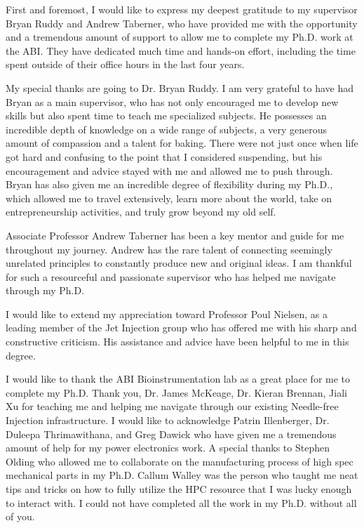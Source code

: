 \begin{acknowledgements}


    First and foremost, I would like to express my deepest gratitude to my supervisor Bryan Ruddy and Andrew Taberner, who have provided me with the opportunity and a tremendous amount of support to allow me to complete my Ph.D. work at the ABI. They have dedicated much time and hands-on effort, including the time spent outside of their office hours in the last four years.
    
    
    My special thanks are going to Dr. Bryan Ruddy. I am very
    grateful to have had Bryan as a main supervisor, who has not only encouraged me to develop new skills but also spent time to teach me specialized subjects. He possesses an incredible depth of knowledge on a wide range of subjects, a very generous amount of compassion and a talent for baking. There were not just once when life got hard and confusing to the point that I considered suspending, but his encouragement and advice stayed with me and allowed me to push through. Bryan has also given me an incredible degree of flexibility during my Ph.D., which allowed me to travel extensively, learn more about the world, take on entrepreneurship activities, and truly grow beyond my old self.
    
    
    Associate Professor Andrew Taberner has been a key mentor and guide for me throughout my journey. Andrew has the rare talent of connecting seemingly unrelated principles to constantly produce new and original ideas. I am thankful for such a resourceful and passionate supervisor who has helped me navigate through my Ph.D.
    
    
    I would like to extend my appreciation toward Professor Poul Nielsen, as a leading member of the Jet Injection group who has offered me with his sharp and constructive criticism. His assistance and advice have been helpful to me in this degree.
    
    
    I would like to thank the ABI Bioinstrumentation lab as a great place for me to complete my Ph.D. Thank you, Dr. James McKeage, Dr. Kieran Brennan, Jiali Xu for teaching me and helping me navigate through our existing Needle-free Injection infrastructure. I would like to acknowledge Patrin Illenberger, Dr. Duleepa Thrimawithana, and Greg Dawick who have given me a tremendous amount of help for my power electronics work. A special thanks to Stephen Olding who allowed me to collaborate on the manufacturing process of high spec mechanical parts in my Ph.D. Callum Walley was the person who taught me neat tips and tricks on how to fully utilize the HPC resource that I was lucky enough to interact with. I could not have completed all the work in my Ph.D. without all of you. 
    

\end{acknowledgements}
